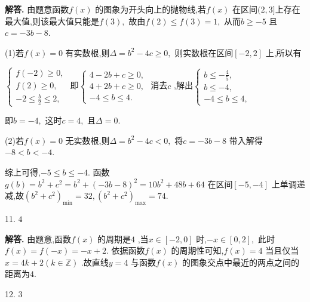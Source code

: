 \documentclass[12pt,a4paper,oneside]{ctexart}
\newenvironment{solution}{\par\noindent\textbf{解答. }}{\\\par}
\begin{document}
\begin{solution}
    由题意函数$ f(x) $ 的图象为开头向上的抛物线,若$ f(x) $ 在区间$ (2,3] $上存在最大值,则该最大值只能是$ f(3), $  故由$ f(2)\leqslant f(3)=1, $ 从而$ b\geqslant -5 $ 且$ c=-3b-8. $ 

    (1)若$ f(x)=0 $ 有实数根,则$ \Delta=b^2-4c\geqslant 0, $ 则实数根在区间$ [-2,2] $ 上,所以有

    $ \begin{cases}
        f(-2)\geqslant 0,\\
        f(2)\geqslant 0,\\
        -2\leqslant \frac{b}{2}\leqslant 2,
    \end{cases} $ 即$ \begin{cases}
        4-2b+c\geqslant 0,\\
        4+2b+c\geqslant 0,\\
        -4\leqslant b\leqslant 4.
    \end{cases} $ 消去$ c $ ,解出$ \begin{cases}
        b\leqslant -\frac{4}{5},\\
        b\leqslant -4,\\
        -4\leqslant b\leqslant 4,
    \end{cases} $ 

    即$ b=-4, $ 这时$ c=4, $ 且$ \Delta=0. $ 

    (2)若$ f(x)=0 $ 无实数根,则$ \Delta=b^2-4c<0, $ 将$ c=-3b-8 $ 带入解得$ -8<b<-4. $ 

    综上可得,$ -5\leqslant b\leqslant -4. $ 函数$ g(b)=b^2+c^2=b^2+(-3b-8)^2=10b^2+48b+64 $ 在区间$ [-5,-4] $ 上单调递减,故$ (b^2+c^2)_{\min} =32,(b^2+c^2)_{\max} =74. $ 
\end{solution}

11. $ 4 $ 

\begin{solution}
    由题意,函数$ f(x) $ 的周期是$ 4 $ ,当$ x\in[-2,0] $ 时,$ -x\in[0,2], $ 此时$ f(x)=f(-x)=-x+2. $ 依据函数$ f(x) $ 的周期性可知,$ f(x)=4 $ 当且仅当$ x=4k+2(k\in \mathbb{Z}) $ .故直线$ y=4 $ 与函数$ f(x) $ 的图象交点中最近的两点之间的距离为$ 4. $ 
\end{solution}

12. $ 3 $
\end{document}

